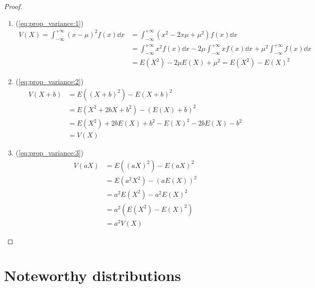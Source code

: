 \documentclass[12pt]{extarticle}
\begin{document}
\begin{proof}
    \skiplineafterproof
    \begin{enumerate}[label=\roman*.]
        \item (\autoref{eq:prop_variance:1})
              \begin{align}
                  V(X) = \int_{-\infty}^{+\infty} (x - \mu)^2 f(x) \dd{x} & = \int_{-\infty}^{+\infty} (x^2 - 2x\mu + \mu^2) f(x) \dd{x}                                                                          \\
                                                                          & = \int_{-\infty}^{+\infty} x^2 f(x) \dd{x} - 2\mu \int_{-\infty}^{+\infty} x f(x) \dd{x} + \mu^2 \int_{-\infty}^{+\infty} f(x) \dd{x} \\
                                                                          & = E(X^2) - 2\mu E(X) + \mu^2 = E(X^2) - E(X)^2
              \end{align}

        \item (\autoref{eq:prop_variance:2})
              \begin{align}
                  V(X + b) & = E((X + b)^2) - E(X + b)^2                     \\
                           & = E(X^2 + 2bX + b^2) - (E(X) + b)^2             \\
                           & = E(X^2) + 2bE(X) + b^2 - E(X)^2 - 2bE(X) - b^2 \\
                           & = V(X)
              \end{align}

        \item (\autoref{eq:prop_variance:3})
              \begin{align}
                  V(aX) & = E((aX)^2) - E(aX)^2     \\
                        & = E(a^2 X^2) - (aE(X))^2  \\
                        & = a^2 E(X^2) - a^2 E(X)^2 \\
                        & = a^2 (E(X^2) - E(X)^2)   \\
                        & = a^2 V(X)
              \end{align}
    \end{enumerate}
\end{proof}


\section{Noteworthy distributions}
\end{document}
